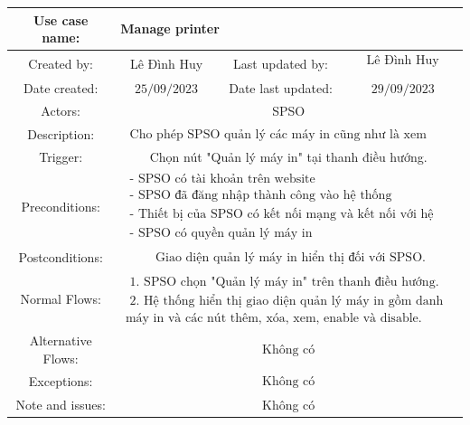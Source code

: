\begin{tabular}{|c|c|c|c|}
\hline Use case name: & \multicolumn{3}{|l|}{ Manage printer} \\
\hline Created by: & Lê Đình Huy & Last updated by: & $\begin{array}{l}\text { Lê Đình Huy } \\\end{array}$ \\
\hline Date created: & $25 / 09 / 2023$ & Date last updated: & $29 / 09 / 2023$\\
\hline Actors: & \multicolumn{3}{|c|}{ SPSO } \\
\hline Description: & \multicolumn{3}{|c|}{$\begin{array}{l}\text { Cho phép SPSO quản lý các máy in cũng như là xem danh sách các máy in.}\end{array}$} \\
\hline Trigger: & \multicolumn{3}{|c|}{ Chọn nút "Quản lý máy in" tại thanh điều hướng. } \\
\hline Preconditions: & \multicolumn{3}{|c|}{$\begin{array}{l}\text { - SPSO có tài khoản trên website } \\
\text { - SPSO đã đăng nhập thành công vào hệ thống } \\
\text { - Thiết bị của SPSO có kết nối mạng và kết nối với hệ thống }\\
\text { - SPSO có quyền quản lý máy in }\end{array}$} \\
\hline Postconditions: & \multicolumn{3}{|c|}{$\begin{array}{l}\text { Giao diện quản lý máy in hiển thị đối với SPSO.} \end{array}$} \\
\hline Normal Flows: & \multicolumn{3}{|c|}{$\begin{array}{l}\text { 1. SPSO chọn "Quản lý máy in" trên thanh điều hướng. } \\
\text { 2. Hệ thống hiển thị giao diện quản lý máy in gồm danh sách các}\\
\text{máy in và các nút thêm, xóa, xem, enable và disable. } \end{array}$} \\
\hline  Alternative Flows: & \multicolumn{3}{|c|}{$\begin{array}{l} 
\text {Không có}\end{array}$} \\
\hline Exceptions: & \multicolumn{3}{|c|}{$\begin{array}{l}
\text {Không có}\end{array}$} \\
\hline Note and issues: & \multicolumn{3}{|c|}{ Không có } \\
\hline
\end{tabular}

